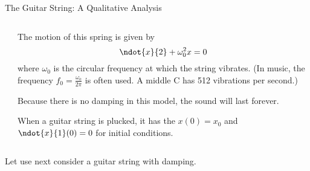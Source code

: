 \documentclass{beamer}
\begin{document}
\begin{frame}{The Guitar String: A Qualitative Analysis}
\begin{block}{}
\begin{columns}
\begin{column}{0.4\textwidth}
\end{column}
\begin{column}{0.55\textwidth}
\pause
The motion of this spring is given by
\begin{equation*}
\ndot{x}{2}+\omega_0^2 x=0
\end{equation*}
where $\omega_0$ is the circular frequency at which the string vibrates. (In music, the frequency $f_0=\tfrac{\omega_o}{2\pi}$ is often used. A middle C has 512 vibrations per second.)\pause

Because there is no damping in this model, the sound will last forever.\pause

When a guitar string is plucked, it has the $x(0)=x_0$ and $\ndot{x}{1}(0)=0$ for initial conditions.
\end{column}
\end{columns}
\end{block}\pause

\begin{block}{}
Let use next consider a guitar string with damping.
\end{block}
\end{frame}
\end{document}
